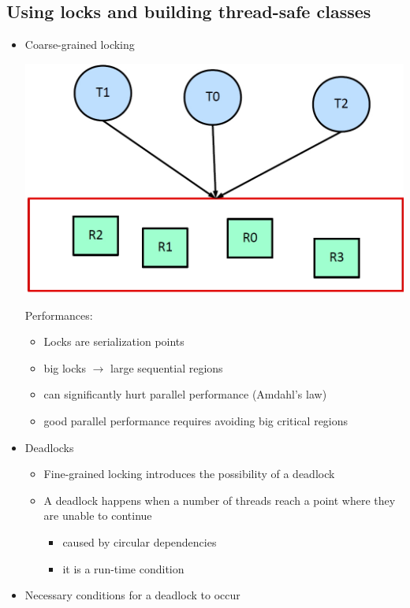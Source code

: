\documentclass[a4paper]{article}
\begin{document}
\subsection*{Using locks and building thread-safe classes}
	\begin{itemize}
		\item Coarse-grained locking
		\begin{center}
				\includegraphics[scale=1]{Figures/CoarseGrainedLocking.jpg}
		\end{center}
		Performances:
			\begin{itemize}
				\item Locks are serialization points
				\item big locks $\to$ large sequential regions
				\item can significantly hurt parallel performance (Amdahl's law)
				\item good parallel performance requires avoiding big critical regions
			\end{itemize}
		\item Deadlocks
			\begin{itemize}
				\item Fine-grained locking introduces the possibility of a deadlock
				\item A deadlock happens when a number of threads reach a point where they are unable to continue
					\begin{itemize}
						\item caused by circular dependencies
						\item it is a run-time condition
					\end{itemize}
			\end{itemize}
		\item Necessary conditions for a deadlock to occur

\end{itemize}
\end{document}
